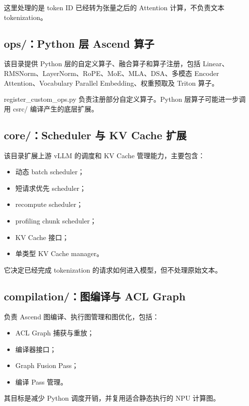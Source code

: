\documentclass[UTF8,11pt,a4paper]{ctexart}
\DeclareRobustCommand{\folder}[1]{\texttt{\detokenize{#1}}}
\def\folder#1{#1}%
\begin{document}
这里处理的是 token ID 已经转为张量之后的 Attention 计算，不负责文本 tokenization。

\subsection{\folder{ops/}：Python 层 Ascend 算子}

该目录提供 Python 层的自定义算子、融合算子和算子注册，包括 Linear、RMSNorm、LayerNorm、RoPE、MoE、MLA、DSA、多模态 Encoder Attention、Vocabulary Parallel Embedding、权重预取及 Triton 算子。

\folder{register_custom_ops.py} 负责注册部分自定义算子。Python 层算子可能进一步调用 \folder{csrc/} 编译产生的底层扩展。

\subsection{\folder{core/}：Scheduler 与 KV Cache 扩展}

该目录扩展上游 vLLM 的调度和 KV Cache 管理能力，主要包含：

\begin{itemize}
  \item 动态 batch scheduler；
  \item 短请求优先 scheduler；
  \item recompute scheduler；
  \item profiling chunk scheduler；
  \item KV Cache 接口；
  \item 单类型 KV Cache manager。
\end{itemize}

它决定已经完成 tokenization 的请求如何进入模型，但不处理原始文本。

\subsection{\folder{compilation/}：图编译与 ACL Graph}

负责 Ascend 图编译、执行图管理和图优化，包括：

\begin{itemize}
  \item ACL Graph 捕获与重放；
  \item 编译器接口；
  \item Graph Fusion Pass；
  \item 编译 Pass 管理。
\end{itemize}

其目标是减少 Python 调度开销，并复用适合静态执行的 NPU 计算图。
\end{document}

